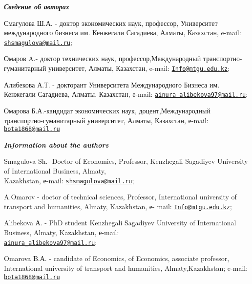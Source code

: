 \begin{authorinfo}
\emph{{\bfseries Сведение об авторах}}

Смагулова Ш.А. - доктор экономических наук, профессор, Университет
международного бизнеса им. Кенжегали Сагадиева, Алматы, Казахстан,
e-mail:
\href{mailto:shsmagulova@mail.ru}{\nolinkurl{shsmagulova@mail.ru}};

Омаров A.- доктор технических наук, профессор,Международный
транспортно-гуманитарный университет, Алматы, Казахстан, e-mail:
\href{mailto:Info@mtgu.edu.kz}{\nolinkurl{Info@mtgu.edu.kz}};

Алибекова А.Т. - докторант Университета Международного Бизнеса им.
Кенжегали Сагадиева, Алматы, Казахстан, е-mail:
\href{mailto:ainura_alibekova97@mail.ru}{\nolinkurl{ainura\_alibekova97@mail.ru}};

Омарова Б.А.-кандидат экономических наук, доцент,Международный
транспортно-гуманитарный университет, Алматы, Казахстан, е-mail:
\href{mailto:bota1868@mail.ru}{\nolinkurl{bota1868@mail.ru}}

\emph{{\bfseries Information about the authors}}

Smagulova Sh.- Doctor of Economics, Professor, Kenzhegali Sagadiyev
University of International Business, Almaty, \\Kazakhstan, е-mail:
\href{mailto:shsmagulova@mail.ru}{\nolinkurl{shsmagulova@mail.ru}};

A.Omarov - doctor of technical sciences, Professor, International
university of transport and humanities, Almaty, Kazakhstan, е- mail:
\href{mailto:Info@mtgu.edu.kz}{\nolinkurl{Info@mtgu.edu.kz}};

Alibekova А. - PhD student Kenzhegali Sagadiyev University of
International Business, Almaty, Kazakhstan, е-mail:\\
\href{mailto:ainura_alibekova97@mail.ru}{\nolinkurl{ainura\_alibekova97@mail.ru}};

Omarova B.А. - candidate of Economics, of Economics, associate
professor, International university of transport and humanities,
Almaty,Kazakhstan; e-mail:
\href{mailto:bota1868@mail.ru}{\nolinkurl{bota1868@mail.ru}}
\end{authorinfo}
